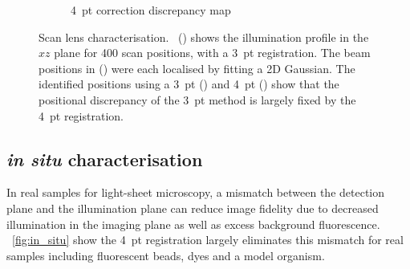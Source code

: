 \begin{figure}
\begin{subfigure}[t]{0.4\textwidth}
        \caption{4~pt correction discrepancy map}\label{fig:scan_lens/discrepancyHeatMap4pt_v2}
    \end{subfigure}
    \hfill
    \caption[Scan lens characterisation]{Scan lens characterisation. \figurename~() shows the illumination profile in the \(xz\) plane for 400 scan positions, %
    with a 3~pt registration.
    The beam positions in %
    () were each localised by fitting a \gls{2D} Gaussian.
    The identified positions %
    using a 3~pt () and 4~pt () %
    show that the positional discrepancy of the 3~pt method is largely fixed by the 4~pt registration.
    }\label{fig:scan_lens}
\end{figure}

\subsection{\emph{in situ} characterisation}

In real samples for
\gls{light-sheet} microscopy, %
a mismatch between the detection plane and the illumination plane %
can %
reduce image fidelity due to decreased illumination in the imaging plane as well as
excess background fluorescence.
\figurename~\ref{fig:in_situ} show the 4~pt registration largely eliminates this %
mismatch for real samples including fluorescent beads, dyes and a model organism.


